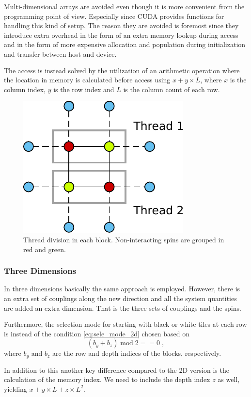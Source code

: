 \documentclass[paper=a4, fontsize=11pt]{scrartcl} %
\numberwithin{equation}{section} %
\numberwithin{figure}{section} %
\numberwithin{table}{section} %
\begin{document}
Multi-dimensional arrays are avoided even though it is more convenient from the programming point of view. Especially since CUDA provides functions for handling this kind of setup. The reason they are avoided is foremost since they introduce extra overhead in the form of an extra memory lookup during access and in the form of more expensive allocation and population during initialization and transfer between host and device.

The access is instead solved by the utilization of an arithmetic operation where the location in memory is calculated before access using $x + y \times L$, where $x$ is the column index, $y$ is the row index and $L$ is the column count of each row.

\begin{figure}
\centering
\includegraphics[width=.4\linewidth]{images/2D_threads.pdf}
\caption{Thread division in each block. Non-interacting spins are grouped in red and green.}
\label{fig:2D_threads}
\end{figure}


\subsubsection{Three Dimensions}
In three dimensions basically the same approach is employed. However, there is an extra set of couplings along the new direction and all the system quantities are added an extra dimension. That is the three sets of couplings and the spins. 

Furthermore, the selection-mode for starting with black or white tiles at each row is instead of the condition \ref{eq:sele_mode_2d} chosen based on
\begin{equation}
(b_y + b_z)\; \text{mod} \; 2 == 0 \;,
\end{equation}
where $b_y$ and $b_z$ are the row and depth indices of the blocks, respectively. 

In addition to this another key difference compared to the 2D version is the calculation of the memory index. We need to include the depth index $z$ as well, yielding $x + y \times L + z \times L^2$.
\end{document}

